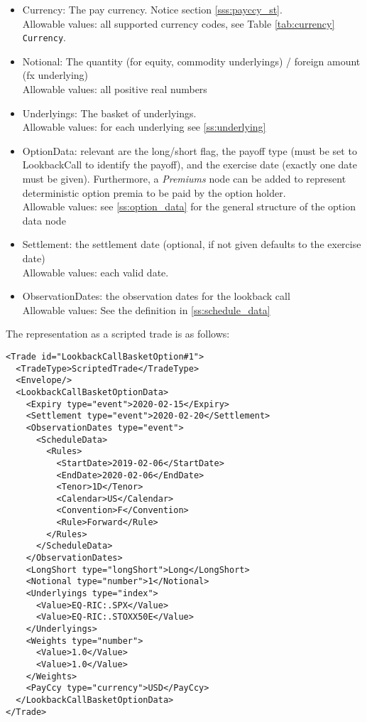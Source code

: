 \begin{itemize}
\item Currency: The pay currency. Notice section \ref{sss:payccy_st}. \\
  Allowable values: all supported currency codes, see Table \ref{tab:currency} \lstinline!Currency!.
\item Notional: The quantity (for equity, commodity underlyings) / foreign amount (fx underlying) \\
  Allowable values: all positive real numbers
\item Underlyings: The basket of underlyings. \\
  Allowable values: for each underlying see \ref{ss:underlying}
\item OptionData: relevant are the long/short flag, the payoff type (must be set to LookbackCall to
  identify the payoff), and the exercise date (exactly one date must be given). Furthermore, a \emph{Premiums} node can be added to represent deterministic option premia to be paid by the option holder. \\
  Allowable values: see \ref{ss:option_data} for the general structure of the option data node
\item Settlement: the settlement date (optional, if not given defaults to the exercise date) \\
  Allowable values: each valid date.
\item ObservationDates: the observation dates for the lookback call \\
  Allowable values: See the definition in \ref{ss:schedule_data}
\end{itemize}

The representation as a scripted trade is as follows:

\begin{verbatim}
<Trade id="LookbackCallBasketOption#1">
  <TradeType>ScriptedTrade</TradeType>
  <Envelope/>
  <LookbackCallBasketOptionData>
    <Expiry type="event">2020-02-15</Expiry>
    <Settlement type="event">2020-02-20</Settlement>
    <ObservationDates type="event">
      <ScheduleData>
        <Rules>
          <StartDate>2019-02-06</StartDate>
          <EndDate>2020-02-06</EndDate>
          <Tenor>1D</Tenor>
          <Calendar>US</Calendar>
          <Convention>F</Convention>
          <Rule>Forward</Rule>
        </Rules>
      </ScheduleData>
    </ObservationDates>
    <LongShort type="longShort">Long</LongShort>
    <Notional type="number">1</Notional>
    <Underlyings type="index">
      <Value>EQ-RIC:.SPX</Value>
      <Value>EQ-RIC:.STOXX50E</Value>
    </Underlyings>
    <Weights type="number">
      <Value>1.0</Value>
      <Value>1.0</Value>
    </Weights>
    <PayCcy type="currency">USD</PayCcy>
  </LookbackCallBasketOptionData>
</Trade>
\end{verbatim}

